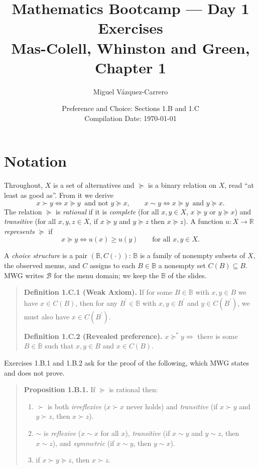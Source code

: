 \documentclass[12pt]{article}
\title{\textbf{Mathematics Bootcamp --- Day 1 Exercises}\\[.4em]
       \large Mas-Colell, Whinston and Green, Chapter 1}
\author{Miguel V\'azquez-Carrero}
\date{Preference and Choice: Sections 1.B and 1.C\\[.3em]
      \normalsize Compilation Date: \today}
\begin{document}
\maketitle

\section*{Notation}

Throughout, $X$ is a set of alternatives and $\succeq$ is a binary relation on
$X$, read ``at least as good as''. From it we derive
\[
x\succ y \iff x\succeq y \ \text{ and not } y\succeq x,
\qquad
x\sim y \iff x\succeq y \ \text{ and } y\succeq x .
\]
The relation $\succeq$ is \emph{rational} if it is
\emph{complete} (for all $x,y\in X$, $x\succeq y$ or $y\succeq x$)
and \emph{transitive} (for all $x,y,z\in X$, if $x\succeq y$ and $y\succeq z$
then $x\succeq z$). A function $u:X\to\mathbb R$ \emph{represents} $\succeq$ if
\[
x\succeq y \iff u(x)\geq u(y)\qquad\text{for all }x,y\in X .
\]

A \emph{choice structure} is a pair $(\mathbb B,C(\cdot))$: $\mathbb B$ is a
family of nonempty subsets of $X$, the observed menus, and $C$ assigns to each
$B\in\mathbb B$ a nonempty set $C(B)\subseteq B$. MWG writes $\mathcal B$ for
the menu domain; we keep the $\mathbb B$ of the slides.

\begin{quote}
\textbf{Definition 1.C.1 (Weak Axiom).}
If for some $B\in\mathbb B$ with $x,y\in B$ we have $x\in C(B)$, then for any
$B^{\prime}\in\mathbb B$ with $x,y\in B^{\prime}$ and $y\in C(B^{\prime})$, we
must also have $x\in C(B^{\prime})$.

\medskip
\textbf{Definition 1.C.2 (Revealed preference).}
$x\succeq^{*}y \iff$ there is some $B\in\mathbb B$ such that $x,y\in B$ and
$x\in C(B)$.
\end{quote}

Exercises 1.B.1 and 1.B.2 ask for the proof of the following, which MWG states
and does not prove.

\begin{quote}
\textbf{Proposition 1.B.1.} If $\succeq$ is rational then:
\begin{enumerate}[label=(\roman*),leftmargin=2.4em,topsep=.3em,itemsep=.2em]
  \item $\succ$ is both \emph{irreflexive} ($x\succ x$ never holds) and
        \emph{transitive} (if $x\succ y$ and $y\succ z$, then $x\succ z$).
  \item $\sim$ is \emph{reflexive} ($x\sim x$ for all $x$), \emph{transitive}
        (if $x\sim y$ and $y\sim z$, then $x\sim z$), and \emph{symmetric}
        (if $x\sim y$, then $y\sim x$).
  \item if $x\succ y\succeq z$, then $x\succ z$.
\end{enumerate}
\end{quote}
\end{document}
